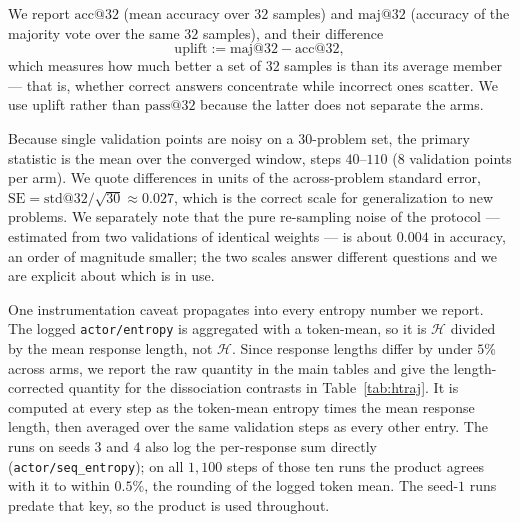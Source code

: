 \documentclass[11pt]{article}
\newcommand{\Htraj}{\mathcal{H}}
\begin{document}
We report $\mathrm{acc@}32$ (mean accuracy over $32$ samples) and $\mathrm{maj@}32$
(accuracy of the majority vote over the same $32$ samples), and their difference
%
\begin{equation*}
\mathrm{uplift} := \mathrm{maj@}32 - \mathrm{acc@}32,
\end{equation*}
%
which measures how much better a set of $32$ samples is than its average member ---
that is, whether correct answers concentrate while incorrect ones scatter. We use
uplift rather than $\mathrm{pass@}32$ because the latter does not separate the arms.

Because single validation points are noisy on a $30$-problem set, the primary
statistic is the mean over the converged window, steps $40$--$110$ ($8$ validation
points per arm). We quote differences in units of the across-problem standard error,
$\mathrm{SE} = \mathrm{std@}32 / \sqrt{30} \approx 0.027$, which is the correct scale
for generalization to new problems. We separately note that the pure re-sampling
noise of the protocol --- estimated from two validations of identical weights --- is
about $0.004$ in accuracy, an order of magnitude smaller; the two scales answer
different questions and we are explicit about which is in use.

One instrumentation caveat propagates into every entropy number we report. The
logged \texttt{actor/entropy} is aggregated with a token-mean, so it is
$\Htraj$ divided by the mean response length, not $\Htraj$. Since response lengths
differ by under $5\%$ across arms, we report the raw quantity in the main tables and
give the length-corrected quantity for the dissociation contrasts in
Table~\ref{tab:htraj}. It is computed at every step as the token-mean entropy times
the mean response length, then averaged over the same validation steps as every other
entry. The runs on seeds $3$ and $4$ also log the per-response sum directly
(\texttt{actor/seq\_entropy}); on all $1{,}100$ steps of those ten runs the product
agrees with it to within $0.5\%$, the rounding of the logged token mean. The seed-$1$
runs predate that key, so the product is used throughout.
\end{document}
